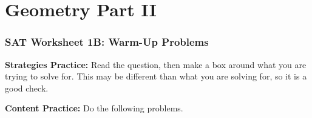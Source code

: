 \chapter{Geometry Part II}

\subsection{SAT Worksheet 1B: Warm-Up Problems}

\textbf{Strategies Practice:} Read the question, then make a box around what you are trying to solve for. This may be different than what you are solving for, so it is a good check.

\begin{multienumerate}
\end{multienumerate}

\hrulefill

\textbf{Content Practice:} Do the following problems.

